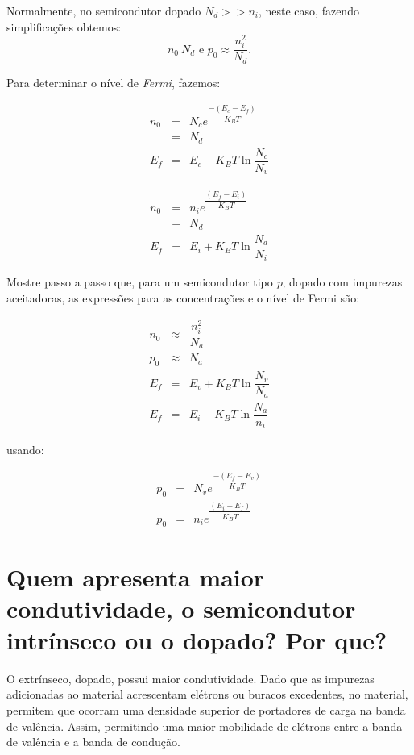Normalmente,  no semicondutor  dopado  $N_{d} >>  n_{i}$, neste  caso,
fazendo simplificações  obtemos: $$n_{0} ~ N_{d}  \,\, \mathrm{e} \,\,
p_{0} \approx \dfrac{n^{2}_{i}}{N_{d}}.$$

Para determinar o nível de \emph{Fermi}, fazemos:

\begin{eqnarray*}
  n_{0} & = & N_{c} e^{\dfrac{-(E_{c} - E_{f})}{K_{B}T}} \\ \nonumber
       & = & N_{d} \\ \nonumber
  E_{f} & = & E_{c} - K_{B}T \ln{\dfrac{N_{c}}{N_{v}}} \nonumber
\end{eqnarray*}

\begin{eqnarray*}
  n_{0} & = & n_{i} e^{\dfrac{(E_{f} - E_{i})}{K_{B}T}} \\ \nonumber
       & = & N_{d} \\ \nonumber
  E_{f} & = & E_{i} + K_{B}T \ln{\dfrac{N_{d}}{N_{i}}} \nonumber
\end{eqnarray*}

Mostre passo a  passo que, para um semicondutor  tipo \emph{p}, dopado
com impurezas  aceitadoras, as  expressões para  as concentrações  e o
nível de Fermi são:

\begin{eqnarray*}
  n_{0} & \approx & \dfrac{n^{2}_{i}}{N_{a}} \\ \nonumber
  p_{0} & \approx & N_{a} \\ \nonumber
  E_{f} & = & E_{v} + K_{B}T \ln{\dfrac{N_{v}}{N_{a}}} \\ \nonumber
  E_{f} & = & E_{i} - K_{B}T \ln{\dfrac{N_{a}}{n_{i}}} \nonumber
\end{eqnarray*}

usando:

\begin{eqnarray*}
  p_{0} & = & N_{v} e^{\dfrac{-(E_{f} - E_{v})}{K_{B}T}} \\ \nonumber
  p_{0} & = & n_{i} e^{\dfrac{(E_{i} - E_{f})}{K_{B}T}} \nonumber
\end{eqnarray*}

\section*{Quem   apresenta   maior   condutividade,   o   semicondutor
intrínseco ou o dopado? Por que?}
\label{q20}

O  extrínseco,  dopado,  possui   maior  condutividade.  Dado  que  as
impurezas  adicionadas ao  material  acrescentam  elétrons ou  buracos
excedentes, no  material, permitem que ocorram  uma densidade superior
de portadores  de carga  na banda de  valência. Assim,  permitindo uma
maior mobilidade  de elétrons entre a  banda de valência e  a banda de
condução.

